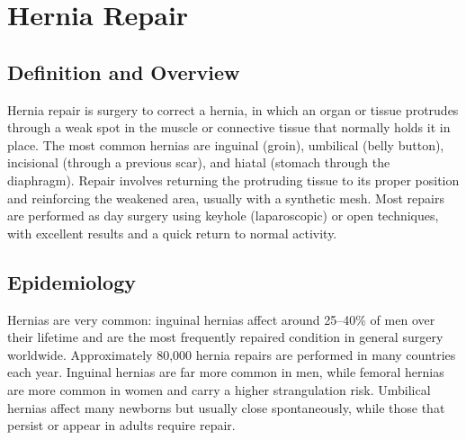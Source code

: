\chapter{Hernia Repair}

\section*{Definition and Overview}
Hernia repair is surgery to correct a hernia, in which an organ or tissue protrudes through a weak spot in the muscle or connective tissue that normally holds it in place. The most common hernias are inguinal (groin), umbilical (belly button), incisional (through a previous scar), and hiatal (stomach through the diaphragm). Repair involves returning the protruding tissue to its proper position and reinforcing the weakened area, usually with a synthetic mesh. Most repairs are performed as day surgery using keyhole (laparoscopic) or open techniques, with excellent results and a quick return to normal activity.

\section*{Epidemiology}
Hernias are very common: inguinal hernias affect around 25--40\% of men over their lifetime and are the most frequently repaired condition in general surgery worldwide. Approximately 80,000 hernia repairs are performed in many countries each year. Inguinal hernias are far more common in men, while femoral hernias are more common in women and carry a higher strangulation risk. Umbilical hernias affect many newborns but usually close spontaneously, while those that persist or appear in adults require repair.

